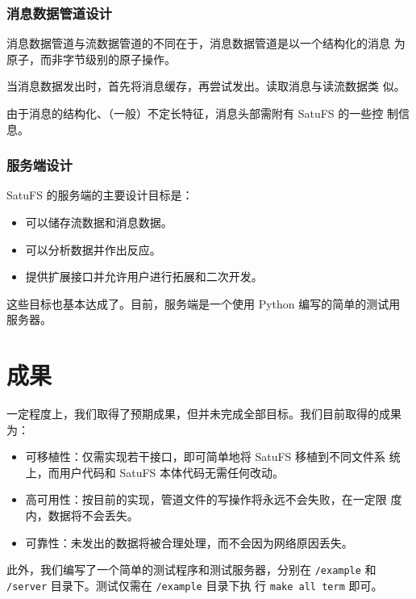 \documentclass{ctexart}
\begin{document}
\subsubsection{消息数据管道设计}
\label{sec:message}

{
  \kaishu

  消息数据管道与流数据管道的不同在于，消息数据管道是以一个结构化的消息
  为原子，而非字节级别的原子操作。

  当消息数据发出时，首先将消息缓存，再尝试发出。读取消息与读流数据类
  似。

  由于消息的结构化、（一般）不定长特征，消息头部需附有 SatuFS 的一些控
  制信息。

}

\subsubsection{服务端设计}
\label{sec:server}

SatuFS 的服务端的主要设计目标是：

\begin{itemize}
\item 可以储存流数据{\kaishu 和消息数据}。
\item 可以分析数据并作出反应。
\item 提供扩展接口并允许用户进行拓展和二次开发。
\end{itemize}

这些目标也基本达成了。目前，服务端是一个使用 Python 编写的简单的测试用
服务器。

\section{成果}
\label{sec:result}

一定程度上，我们取得了预期成果，但并未完成全部目标。我们目前取得的成果
为：

\begin{itemize}
\item 可移植性：仅需实现若干接口，即可简单地将 SatuFS 移植到不同文件系
  统上，而用户代码和 SatuFS 本体代码无需任何改动。
\item 高可用性：按目前的实现，管道文件的写操作将永远不会失败，在一定限
  度内，数据将不会丢失。
\item 可靠性：未发出的数据将被合理处理，而不会因为网络原因丢失。
\end{itemize}

此外，我们编写了一个简单的测试程序和测试服务器，分别在 \verb|/example|
和 \verb|/server| 目录下。测试仅需在 \verb|/example| 目录下执
行 \verb|make all term| 即可。
\end{document}
